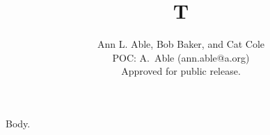 \documentclass{article}
\begin{document}
\title{T}
\author{Ann L. Able, Bob Baker, and Cat Cole \\ POC: A.\ Able (ann.able@a.org)\\ Approved for public release.}
\maketitle
Body.
\end{document}

